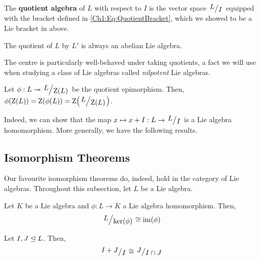 \begin{boxdefinition}
    The \textbf{quotient algebra} of $L$ with respect to $I$ is the vector space $\quotient{L}{I}$ equipped with the bracket defined in \eqref{Ch1:Eq:QuotientBracket}, which we showed to be a Lie bracket in  above.
\end{boxdefinition}

\begin{boxexample}
    The quotient of $L$ by $L'$ is always an abelian Lie algebra.
\end{boxexample}


The centre is particularly well-behaved under taking quotients, a fact we will use when studying a class of Lie algebras called \textit{nilpotent} Lie algebras.

\begin{boxproposition}
    Let $\phi : L \surj \quotient{L}{\Zof{L}}$ be the quotient epimorphism. Then, $\phiof{\Zof{L}} = \Zof{\phiof{L}} = \Zof{\quotient{L}{\Zof{L}}}$.
\end{boxproposition}

Indeed, we can show that the map $x \mapsto x + I : L \to \quotient{L}{I}$ is a Lie algebra homomorphism. More generally, we have the following results. %

\subsection{Isomorphism Theorems}

Our favourite isomorphism theorems do, indeed, hold in the category of Lie algebras. Throughout this subsection, let $L$ be a Lie algebra.

\begin{boxtheorem}\label{SP:Thm:FirstIso}
    Let $K$ be a Lie algebra and $\phi : L \to K$ a Lie algebra homomorphism. Then,
    \begin{align}
        \quotient{L}{\pker{\phi}} \cong \pim{\phi}
        \label{SP:Eq:FirstIsomorphism}
    \end{align}
\end{boxtheorem}

\begin{boxtheorem}\label{SP:Thm:SecondIso}
    Let $I, J \trianglelefteq L$. Then,
    \begin{align}
        \quotient{I + J}{I} \cong \quotient{J}{I \cap J}
        \label{SP:Eq:SecondIsomorphism}
    \end{align}
\end{boxtheorem}

